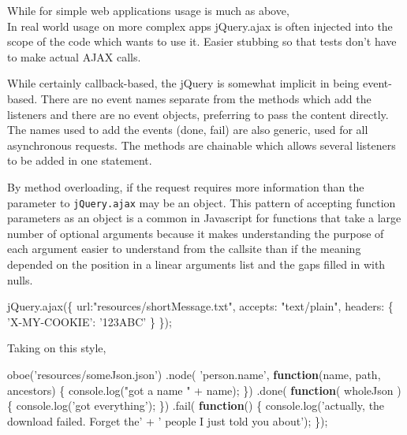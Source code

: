 \documentclass[]{article}
\newenvironment{Shaded}{}{}
\newcommand{\KeywordTok}[1]{\textcolor[rgb]{0.00,0.44,0.13}{\textbf{{#1}}}}
\newcommand{\DataTypeTok}[1]{\textcolor[rgb]{0.56,0.13,0.00}{{#1}}}
\newcommand{\StringTok}[1]{\textcolor[rgb]{0.25,0.44,0.63}{{#1}}}
\newcommand{\OtherTok}[1]{\textcolor[rgb]{0.00,0.44,0.13}{{#1}}}
\newcommand{\FunctionTok}[1]{\textcolor[rgb]{0.02,0.16,0.49}{{#1}}}
\newcommand{\NormalTok}[1]{{#1}}
\begin{document}
While for simple web applications usage is much as above,\\In real world
usage on more complex apps jQuery.ajax is often injected into the scope
of the code which wants to use it. Easier stubbing so that tests don't
have to make actual AJAX calls.

While certainly callback-based, the jQuery is somewhat implicit in being
event-based. There are no event names separate from the methods which
add the listeners and there are no event objects, preferring to pass the
content directly. The names used to add the events (done, fail) are also
generic, used for all asynchronous requests. The methods are chainable
which allows several listeners to be added in one statement.

By method overloading, if the request requires more information than the
parameter to \texttt{jQuery.ajax} may be an object. This pattern of
accepting function parameters as an object is a common in Javascript for
functions that take a large number of optional arguments because it
makes understanding the purpose of each argument easier to understand
from the callsite than if the meaning depended on the position in a
linear arguments list and the gaps filled in with nulls.

\begin{Shaded}
\begin{Highlighting}[]
\OtherTok{jQuery}\NormalTok{.}\FunctionTok{ajax}\NormalTok{(\{ }\DataTypeTok{url}\NormalTok{:}\StringTok{"resources/shortMessage.txt"}\NormalTok{,}
              \DataTypeTok{accepts}\NormalTok{: }\StringTok{"text/plain"}\NormalTok{,}
              \DataTypeTok{headers}\NormalTok{: \{ }\StringTok{'X-MY-COOKIE'}\NormalTok{: }\StringTok{'123ABC'} \NormalTok{\}}
           \NormalTok{\});}
\end{Highlighting}
\end{Shaded}

Taking on this style,

\begin{Shaded}
\begin{Highlighting}[]
\FunctionTok{oboe}\NormalTok{(}\StringTok{'resources/someJson.json'}\NormalTok{)}
   \NormalTok{.}\FunctionTok{node}\NormalTok{( }\StringTok{'person.name'}\NormalTok{, }\KeywordTok{function}\NormalTok{(name, path, ancestors) \{}
      \OtherTok{console}\NormalTok{.}\FunctionTok{log}\NormalTok{(}\StringTok{"got a name "} \NormalTok{+ name);   }
   \NormalTok{\})}
   \NormalTok{.}\FunctionTok{done}\NormalTok{( }\KeywordTok{function}\NormalTok{( wholeJson ) \{}
      \OtherTok{console}\NormalTok{.}\FunctionTok{log}\NormalTok{(}\StringTok{'got everything'}\NormalTok{);}
   \NormalTok{\})}
   \NormalTok{.}\FunctionTok{fail}\NormalTok{( }\KeywordTok{function}\NormalTok{() \{}
      \OtherTok{console}\NormalTok{.}\FunctionTok{log}\NormalTok{(}\StringTok{'actually, the download failed. Forget the'} \NormalTok{+ }
                  \StringTok{' people I just told you about'}\NormalTok{);}
   \NormalTok{\});}
\end{Highlighting}
\end{Shaded}
\end{document}
